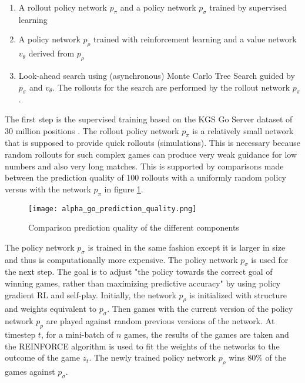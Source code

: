 \begin{enumerate}
    \item A rollout policy network $p_{\pi}$ and a policy network $p_{\sigma}$ trained by supervised learning
    \item A policy network $p_{\rho}$ trained with reinforcement learning and a value network $v_{\theta}$ derived from $p_{\rho}$
    \item Look-ahead search using (asynchronous) Monte Carlo Tree Search guided by $p_{\sigma}$ and $v_{\theta}$. The rollouts for the search are performed by the rollout network $p_{\pi}$.
\end{enumerate}

The first step is the supervised training based on the KGS Go Server dataset of 30 million positions \cite[p. 485]{silver_mastering_2016}. The rollout policy network $p_{\pi}$ is a relatively small network that is supposed to provide quick rollouts (simulations). This is necessary because random rollouts for such complex games can produce very weak guidance for low numbers and also very long matches. This is supported by comparisons made between the prediction quality of 100 rollouts with a uniformly random policy versus with the network $p_{\pi}$ in figure \ref{alpha_go_prediction_quality}.

\begin{figure}
    \centering
    \texttt{[image: alpha\_go\_prediction\_quality.png]}
    \caption{Comparison prediction quality of the different components \cite{silver_mastering_2016}}
    \label{alpha_go_prediction_quality}
\end{figure}

The policy network $p_{\sigma}$ is trained in the same fashion except it is larger in size and thus is computationally more expensive. The policy network $p_{\sigma}$ is used for the next step. The goal is to adjust "the policy towards the correct goal of winning games, rather than maximizing predictive accuracy" \cite[p.484]{silver_mastering_2016} by using policy gradient RL and self-play. Initially, the network $p_{\rho}$ is initialized with structure and weights equivalent to $p_{\sigma}$. Then games with the current version of the policy network $p_{p}$ are played against random previous versions of the network. At timestep $t$, for a mini-batch of $n$ games, the results of the games are taken and the REINFORCE algorithm is used to fit the weights of the networks to the outcome of the game $z_t$. The newly trained policy network $p_{\rho}$ wins 80\% of the games against $p_{\sigma}$.

